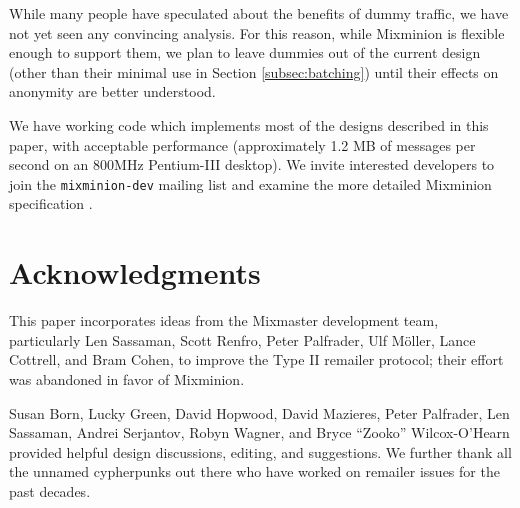 \documentclass[final]{ieee}
\begin{document}
\begin{itemize}
\quad While many people have speculated about the benefits of dummy traffic,
we have not yet seen any convincing analysis. For this reason, while
Mixminion is flexible enough to support them, we plan to leave dummies
out of the current design (other than their minimal use in Section
\ref{subsec:batching}) until their effects on anonymity are better
understood.
\end{itemize}

We have working code which implements most of the designs described in this
paper, with acceptable performance (approximately 1.2 MB of messages per
second on an 800MHz Pentium-III desktop).  We invite interested developers to
join the {\tt mixminion-dev} mailing list and examine the more detailed
Mixminion specification \cite{mixminion-spec}.


\section*{Acknowledgments}

This paper incorporates ideas from the Mixmaster development team,
particularly Len Sassaman, Scott Renfro, Peter Palfrader, Ulf M\"oller,
Lance Cottrell, and Bram Cohen, to improve the Type II remailer protocol;
their effort was abandoned in favor of Mixminion.

Susan Born, Lucky Green, David Hopwood, David Mazieres, Peter Palfrader,
Len Sassaman, Andrei Serjantov, Robyn Wagner, and Bryce ``Zooko'' Wilcox-O'Hearn
provided helpful design discussions, editing, and suggestions. We further
thank all the unnamed cypherpunks out there who have worked on remailer
issues for the past decades.





\end{document}

